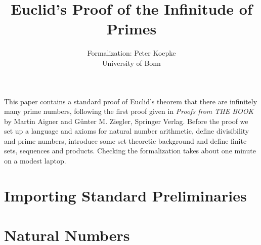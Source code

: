 \documentclass[english,11pt]{article}
\author{\Naproche{} Formalization: Peter Koepke\\
University of Bonn}
\title{Euclid's Proof
of the Infinitude of Primes}
\begin{document}
\newcommand{\Prod}[3]{#1_{#2} \cdots #1_{#3}}
\newcommand{\Seq}[2]{\{#1,\dots,#2\}}
\newcommand{\FinSet}[3]{\{#1_{#2},\dots,#1_{#3}\}}
\newcommand{\Primes}{\mathbb{P}}

\maketitle

This paper contains a standard proof of Euclid's theorem
that there are infinitely many prime numbers,
following the first proof given in \emph{Proofs from THE BOOK}
by Martin Aigner and Günter M. Ziegler, Springer Verlag.
Before the proof we
set up a language and axioms for natural number arithmetic,
define divisibility and prime numbers,
introduce some set theoretic background and define
finite sets, sequences and products.
Checking the formalization takes about one minute on a modest
laptop.


\section{Importing Standard Preliminaries}

\begin{forthel}
\end{forthel}


\section{Natural Numbers}
\end{document}
